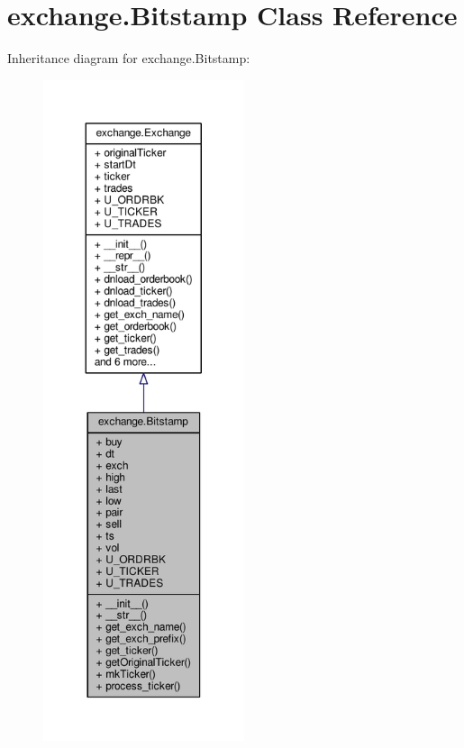 \hypertarget{classexchange_1_1_bitstamp}{}\section{exchange.\+Bitstamp Class Reference}
\label{classexchange_1_1_bitstamp}


Inheritance diagram for exchange.\+Bitstamp\+:
\nopagebreak
\begin{figure}[H]
\begin{center}
\leavevmode
\includegraphics[height=550pt]{classexchange_1_1_bitstamp__inherit__graph}
\end{center}
\end{figure}


